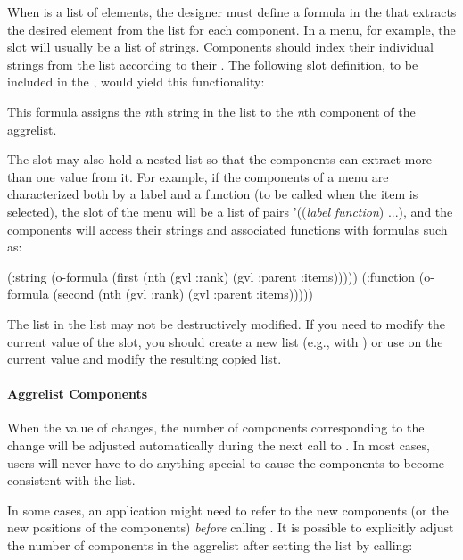 When  is a list of elements, the designer must define a formula
in the  that extracts the desired element from the list
for each component.  In a menu, for example, the  slot will
usually be a list of strings.  Components should index their individual
strings from the  list according to their .  The
following slot
definition, to be included in the , would yield this
functionality:
\begin{programexample}
\end{programexample}
This formula assigns the {\it n}th string in the  list to the
{\it n}th component of the aggrelist.

The  slot may also hold a nested list so that the components
can extract more than one value from it.  For example, if the components
of a menu are characterized both by a label and a function (to be called
when the item is selected), the  slot of the menu will be a list
of pairs '(({\it label} {\it function}) ...), and the components will
access their strings and associated functions with formulas such as:
\begin{programexample}
(:string (o-formula (first (nth (gvl :rank) (gvl :parent :items)))))
(:function (o-formula (second (nth (gvl :rank)
                                   (gvl :parent :items)))))
\end{programexample}

The list in the  list may not be destructively modified.  If you
need to modify the current value of the slot, you should create a new list
(e.g., with ) or use  on the current value and modify
the resulting copied list.


\paragraph{Aggrelist Components}

When the value of  changes, the number of components corresponding
to the change will be adjusted automatically during the next call to
.  In most cases, users will never have to do anything
special to cause the components to become consistent with the  list.

In some cases, an application might need to refer to the new components
(or the new positions of the components) {\it before} calling .
It is possible to explicitly adjust the number of components in the aggrelist
after setting the  list by calling:

